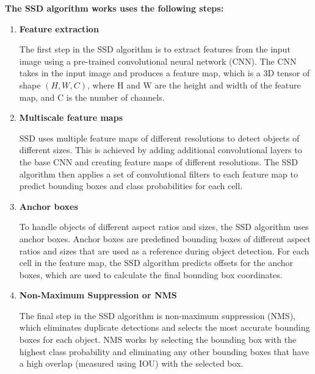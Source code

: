         \textbf{The SSD algorithm works uses the following steps:}
        \begin{enumerate}

            \item \textbf{Feature extraction}
        
            The first step in the SSD algorithm is to extract features from the input image using a pre-trained convolutional neural network (CNN). 
            The CNN takes in the input image and produces a feature map, which is a 3D tensor of shape \((H, W, C)\), where H and W are the height and width of the feature map, and C is the number of channels.
            
            \item \textbf{Multiscale feature maps}
        
            SSD uses multiple feature maps of different resolutions to detect objects of different sizes. 
            This is achieved by adding additional convolutional layers to the base CNN and creating feature maps of different resolutions. 
            The SSD algorithm then applies a set of convolutional filters to each feature map to predict bounding boxes and class probabilities for each cell.

            \item \textbf{Anchor boxes} 
        
            To handle objects of different aspect ratios and sizes, the SSD algorithm uses anchor boxes. 
            Anchor boxes are predefined bounding boxes of different aspect ratios and sizes that are used as a reference during object detection. 
            For each cell in the feature map, the SSD algorithm predicts offsets for the anchor boxes, which are used to calculate the final bounding box coordinates.
        
            \item \textbf{Non-Maximum Suppression or NMS} 
        
            The final step in the SSD algorithm is non-maximum suppression (NMS), which eliminates duplicate detections and selects the most accurate bounding boxes for each object. 
            NMS works by selecting the bounding box with the highest class probability and eliminating any other bounding boxes that have a high overlap (measured using IOU) with the selected box.

        \end{enumerate}